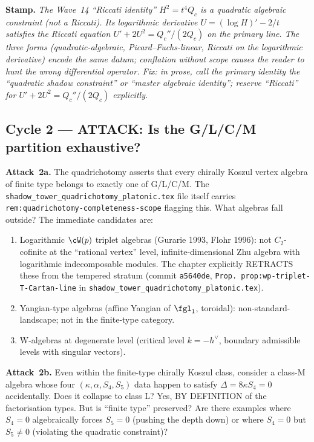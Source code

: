 \textbf{Stamp.} \emph{The Wave~14 ``Riccati identity'' $H^2 = t^4 Q_c$ is
a quadratic algebraic constraint (not a Riccati). Its logarithmic
derivative $U = (\log H)' - 2/t$ satisfies the Riccati equation
$U' + 2U^2 = Q_c''/(2Q_c)$ on the primary line. The three forms
(quadratic-algebraic, Picard--Fuchs-linear, Riccati on the logarithmic
derivative) encode the same datum; conflation without scope causes the
reader to hunt the wrong differential operator. Fix: in prose, call the
primary identity the ``quadratic shadow constraint'' or ``master
algebraic identity''; reserve ``Riccati'' for $U' + 2U^2 = Q_c''/(2Q_c)$
explicitly.}

\subsection*{Cycle 2 --- ATTACK: Is the G/L/C/M partition exhaustive?}

\textbf{Attack~2a.} The quadrichotomy asserts that every chirally Koszul
vertex algebra of finite type belongs to exactly one of G/L/C/M. The
\texttt{shadow\_tower\_quadrichotomy\_platonic.tex} file itself carries
\texttt{rem:quadrichotomy-completeness-scope} flagging this. What algebras
fall outside? The immediate candidates are:
\begin{enumerate}
\item Logarithmic $\cW(p)$ triplet algebras (Gurarie 1993, Flohr 1996): not
  $C_2$-cofinite at the ``rational vertex'' level, infinite-dimensional Zhu
  algebra with logarithmic indecomposable modules. The chapter explicitly
  RETRACTS these from the tempered stratum
  (commit \texttt{a5640de}, \texttt{Prop.~prop:wp-triplet-T-Cartan-line}
  in \texttt{shadow\_tower\_quadrichotomy\_platonic.tex}).
\item Yangian-type algebras (affine Yangian of $\fgl_1$, toroidal):
  non-standard-landscape; not in the finite-type category.
\item W-algebras at degenerate level (critical level $k = -h^\vee$, boundary
  admissible levels with singular vectors).
\end{enumerate}

\textbf{Attack~2b.} Even within the finite-type chirally Koszul class,
consider a class-M algebra whose four $(\kappa, \alpha, S_4, S_5)$ data
happen to satisfy $\Delta = 8\kappa S_4 = 0$ accidentally. Does it
collapse to class L? Yes, BY DEFINITION of the factorisation types. But is
``finite type'' preserved? Are there examples where $S_4 = 0$ algebraically
forces $S_5 = 0$ (pushing the depth down) or where $S_4 = 0$ but $S_5
\ne 0$ (violating the quadratic constraint)?

